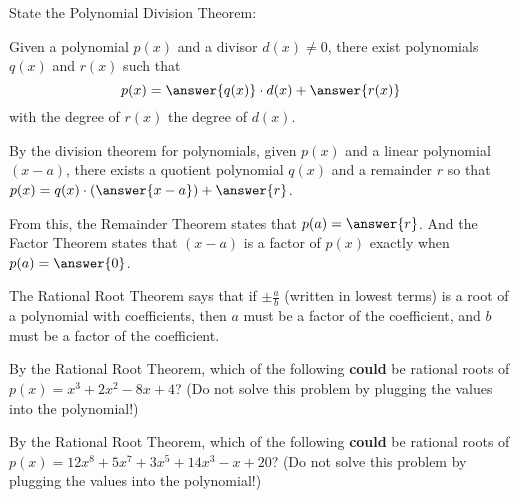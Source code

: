 \documentclass[nooutcomes]{ximera}
\begin{document}
\begin{problem}
State the Polynomial Division Theorem: 

Given a polynomial $p(x)$ and a divisor $d(x)\ne 0$, there exist polynomials $q(x)$ and $r(x)$ such that 
\[
p(x) = \answer{q(x)}\cdot d(x)+\answer{r(x)}
\]
with the degree of $r(x)$ 
\wordChoice{\choice{$=$} \choice[correct]{$<$} \choice{$\le$} \choice{$\ne$} \choice{$>$}}
the degree of $d(x)$. 
\end{problem}

\begin{problem}
By the division theorem for polynomials, given $p(x)$ and a linear polynomial $(x-a)$, there exists a quotient polynomial $q(x)$ and a remainder $r$ so that $p(x)= q(x)\cdot\left(\answer{x-a}\right) + \answer{r}$.  

From this, the Remainder Theorem states that $p(a)=\answer{r}$.  And the Factor Theorem states that $(x-a)$ is a factor of $p(x)$ exactly when $p(a)=\answer{0}$.
\end{problem}

\begin{problem}
The Rational Root Theorem says that if $\pm \frac{a}{b}$ (written in lowest terms) is a root of a polynomial with 
coefficients, then $a$ must be a factor of the 
 coefficient, and $b$ must be a factor of the 
coefficient.
\end{problem}

\begin{problem}
By the Rational Root Theorem, which of the following \textbf{could} be rational roots of $p(x) = x^3 + 2x^2 - 8x + 4$?   
(Do not solve this problem by plugging the values into the polynomial!)
\begin{selectAll}
\end{selectAll}
\end{problem}




\begin{problem}
By the Rational Root Theorem, which of the following \textbf{could} be rational roots of $p(x) = 12x^8 + 5x^7 + 3x^5 + 14x^3 - x + 20$?
(Do not solve this problem by plugging the values into the polynomial!)
\begin{selectAll}
\end{selectAll}
\end{problem}
\end{document}
